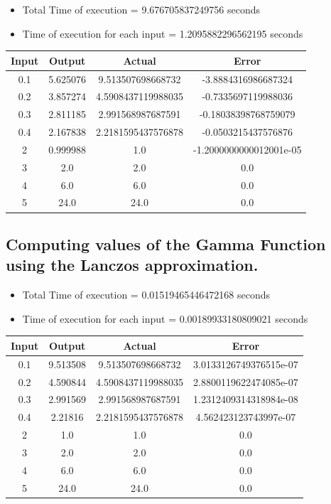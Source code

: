 \documentclass[12pt]{article}
\begin{document}
\begin{itemize}
	\item Total Time of execution = 9.676705837249756 seconds
	\item Time of execution for each input = 1.2095882296562195 seconds
\end{itemize}

\begin{table}[H]
	\centering
	\begin{tabular}{ | c c c c | }
		\hline
		\hline
		Input & Output & Actual & Error\\
		\hline
		\hline
		0.1 & 5.625076 & 9.513507698668732 & -3.8884316986687324\\
		\hline
		0.2 & 3.857274 & 4.5908437119988035 & -0.7335697119988036\\
		\hline
		0.3 & 2.811185 & 2.991568987687591 & -0.18038398768759079\\
		\hline
		0.4 & 2.167838 & 2.2181595437576878 & -0.0503215437576876\\
		\hline
		2 & 0.999988 & 1.0 & -1.2000000000012001e-05\\
		\hline
		3 & 2.0 & 2.0 & 0.0\\
		\hline
		4 & 6.0 & 6.0 & 0.0\\
		\hline
		5 & 24.0 & 24.0 & 0.0\\
		\hline
		\hline
	\end{tabular}
\end{table}

\subsection{Computing values of the Gamma Function using the Lanczos approximation.}

\begin{itemize}
	\item Total Time of execution = 0.01519465446472168 seconds
	\item Time of execution for each input = 0.00189933180809021 seconds
\end{itemize}

\begin{table}[H]
	\centering
	\begin{tabular}{ | c c c c | }
		\hline
		\hline
		Input & Output & Actual & Error\\
		\hline
		\hline
		0.1 & 9.513508 & 9.513507698668732 & 3.0133126749376515e-07\\
		\hline
		0.2 & 4.590844 & 4.5908437119988035 & 2.8800119622474085e-07\\
		\hline
		0.3 & 2.991569 & 2.991568987687591 & 1.2312409314318984e-08\\
		\hline
		0.4 & 2.21816 & 2.2181595437576878 & 4.562423123743997e-07\\
		\hline
		2 & 1.0 & 1.0 & 0.0\\
		\hline
		3 & 2.0 & 2.0 & 0.0\\
		\hline
		4 & 6.0 & 6.0 & 0.0\\
		\hline
		5 & 24.0 & 24.0 & 0.0\\
		\hline
		\hline
	\end{tabular}
\end{table}
\end{document}
